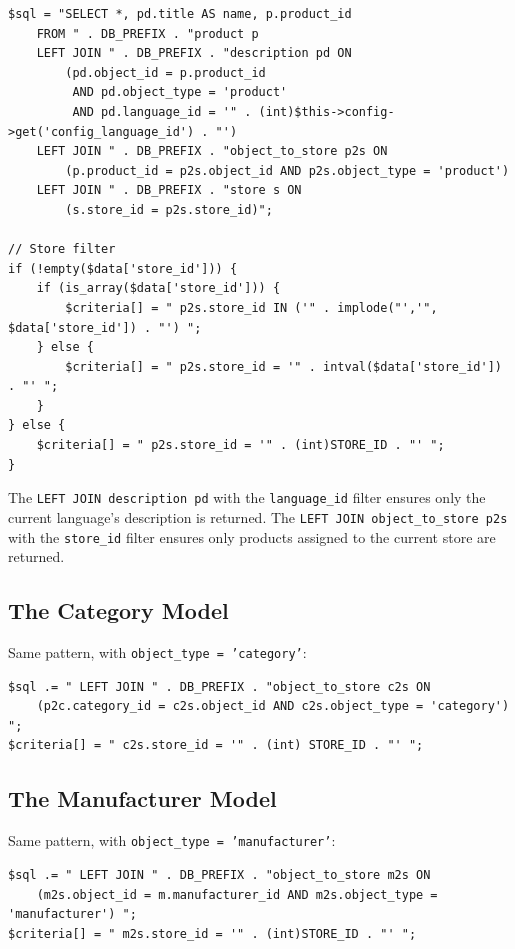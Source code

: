 \documentclass[11pt,a4paper]{article}
\begin{document}
\begin{lstlisting}[caption={Storefront product model: the store + language filter pattern.},label={lst:product-filter}]
$sql = "SELECT *, pd.title AS name, p.product_id
    FROM " . DB_PREFIX . "product p
    LEFT JOIN " . DB_PREFIX . "description pd ON
        (pd.object_id = p.product_id
         AND pd.object_type = 'product'
         AND pd.language_id = '" . (int)$this->config->get('config_language_id') . "')
    LEFT JOIN " . DB_PREFIX . "object_to_store p2s ON
        (p.product_id = p2s.object_id AND p2s.object_type = 'product')
    LEFT JOIN " . DB_PREFIX . "store s ON
        (s.store_id = p2s.store_id)";

// Store filter
if (!empty($data['store_id'])) {
    if (is_array($data['store_id'])) {
        $criteria[] = " p2s.store_id IN ('" . implode("','", $data['store_id']) . "') ";
    } else {
        $criteria[] = " p2s.store_id = '" . intval($data['store_id']) . "' ";
    }
} else {
    $criteria[] = " p2s.store_id = '" . (int)STORE_ID . "' ";
}
\end{lstlisting}

The \texttt{LEFT JOIN description pd} with the
\texttt{language\_id} filter ensures only the current language's
description is returned. The \texttt{LEFT JOIN object\_to\_store p2s}
with the \texttt{store\_id} filter ensures only products assigned to the
current store are returned.

\subsection{The Category Model}

Same pattern, with \texttt{object\_type = 'category'}:

\begin{lstlisting}[caption={Storefront category model: store filter.},label={lst:category-filter}]
$sql .= " LEFT JOIN " . DB_PREFIX . "object_to_store c2s ON
    (p2c.category_id = c2s.object_id AND c2s.object_type = 'category') ";
$criteria[] = " c2s.store_id = '" . (int) STORE_ID . "' ";
\end{lstlisting}

\subsection{The Manufacturer Model}

Same pattern, with \texttt{object\_type = 'manufacturer'}:

\begin{lstlisting}[caption={Storefront manufacturer model: store filter.},label={lst:mfr-filter}]
$sql .= " LEFT JOIN " . DB_PREFIX . "object_to_store m2s ON
    (m2s.object_id = m.manufacturer_id AND m2s.object_type = 'manufacturer') ";
$criteria[] = " m2s.store_id = '" . (int)STORE_ID . "' ";
\end{lstlisting}
\end{document}
